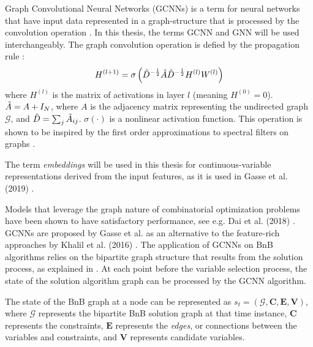 Graph Convolutional Neural Networks (\gls{GCNN}s) is a term for neural networks that have input data represented in a graph-structure that is processed by the convolution operation \cite{kipf2016semisupervised}. In this thesis, the terms \gls{GCNN} and \gls{GNN} will be used interchangeably. The graph convolution operation is defied by the propagation rule \cite{kipf2016semisupervised}:
\begin{equation}
    H^{(l+1)} = \sigma \left( \Tilde{D}^{-\frac{1}{2}} \Tilde{A} \Tilde{D}^{-\frac{1}{2}} H^{(l)}W^{(l)}\right)
\end{equation}
where $H^{(l)}$ is the matrix of activations in layer $l$ (meaning $H^{(0)} = 0$). $\Tilde{A} = A + I_N$, where $A$ is the adjacency matrix representing the undirected graph $\mathcal{G}$, and $\Tilde{D} = \sum_j \Tilde{A}_{i j}$. $\sigma( \cdot) $ is a nonlinear activation function.
This operation is shown to be inspired by the first order approximations to spectral filters on graphs \cite{kipf2016semisupervised}.

The term \textit{embeddings} will be used in this thesis for continuous-variable representations derived from the input features, as it is used in Gasse et al. (2019) \cite{gasse2019exact}. 





Models that leverage the graph nature of combinatorial optimization problems have been shown to have satisfactory performance, see e.g. Dai et al. (2018) \cite{dai2018learning}. 
\gls{GCNN}s are proposed by Gasse et al. \cite{gasse2019exact} as an alternative to the feature-rich approaches by Khalil et al. (2016) \cite{khalil2016learning}. 
The application of \gls{GCNN}s on \gls{BnB} algorithms relies on the bipartite graph structure that results from the solution process, as explained in . At each point before the variable selection process, the state of the solution algorithm graph can be processed by the \gls{GCNN} algorithm. 

The state of the \gls{BnB} graph at a node can be represented as $s_t = (\mathcal{G}, \mathbf{C}, \mathbf{E}, \mathbf{V})$, where $\mathcal{G}$ represents the bipartite \gls{BnB} solution graph at that time instance, $\mathbf{C}$ represents the constraints, $\mathbf{E}$ represents the \textit{edges}, or connections between the variables and constraints, and $\mathbf{V}$ represents candidate variables.  

